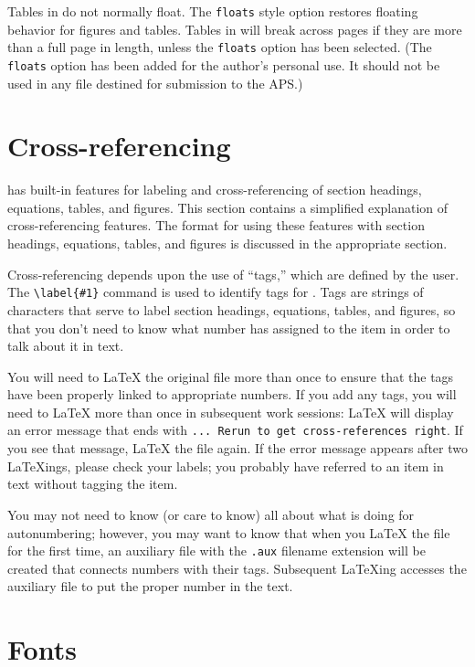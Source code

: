 Tables in \REVTeX{} do not normally float. The \verb+floats+ style option
restores floating behavior for figures and tables. Tables in \REVTeX{} will
break across pages if they are more than a full page in length, unless the
\verb+floats+ option has been selected. (The \verb+floats+ option has been
added for the author's personal use. It should not be used in any file
destined for submission to the APS.)

\section{Cross-referencing}
\label{sec:xrefs}

\REVTeX{} has built-in features for labeling and cross-referencing of
section headings, equations, tables, and figures. This section contains a
simplified explanation of cross-referencing features.  The format for using
these features with section headings, equations, tables, and figures is
discussed in the appropriate section.

Cross-referencing depends upon the use of ``tags,'' which are defined by
the user.  The \verb+\label{#1}+ command is used to identify tags for
\REVTeX . Tags are strings of characters that serve to label section
headings, equations, tables, and  figures, so that you don't need to know
what number \REVTeX{} has assigned to the item in order to talk about it in
text.

You will need to \LaTeX{} the original file more than once to ensure that
the tags have been properly linked to appropriate numbers.  If you add any
tags, you will need to \LaTeX{} more than once in subsequent work sessions:
\LaTeX{} will display an error message that ends with {\tt ... Rerun to get
cross-references right}. If you see that message, \LaTeX{} the file again.
If the error message appears after two \LaTeX ings, please check your
labels; you probably have referred to an item in text without tagging the
item.

You may not need to know (or care to know) all about what \REVTeX{} is
doing for autonumbering; however, you may want to know that when you
\LaTeX{} the file for the first time, an auxiliary file with the {\tt .aux}
filename extension will be created that connects numbers with their tags. 
Subsequent \LaTeX ing accesses the auxiliary file to put the proper number
in the text.

\section{Fonts}
\label{sec:fonts}


